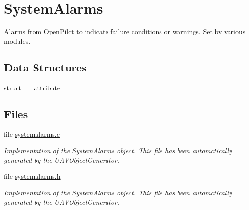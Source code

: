\hypertarget{group___system_alarms}{\section{\-System\-Alarms}
\label{group___system_alarms}
}


\-Alarms from \-Open\-Pilot to indicate failure conditions or warnings. \-Set by various modules.  


\subsection*{\-Data \-Structures}
\begin{DoxyCompactItemize}
\item 
struct \hyperlink{struct____attribute____}{\-\_\-\-\_\-attribute\-\_\-\-\_\-}
\end{DoxyCompactItemize}
\subsection*{\-Files}
\begin{DoxyCompactItemize}
\item 
file \hyperlink{systemalarms_8c}{systemalarms.\-c}
\begin{DoxyCompactList}\small\item\em \-Implementation of the \-System\-Alarms object. \-This file has been automatically generated by the \-U\-A\-V\-Object\-Generator. \end{DoxyCompactList}\item 
file \hyperlink{systemalarms_8h}{systemalarms.\-h}
\begin{DoxyCompactList}\small\item\em \-Implementation of the \-System\-Alarms object. \-This file has been automatically generated by the \-U\-A\-V\-Object\-Generator. \end{DoxyCompactList}\end{DoxyCompactItemize}
